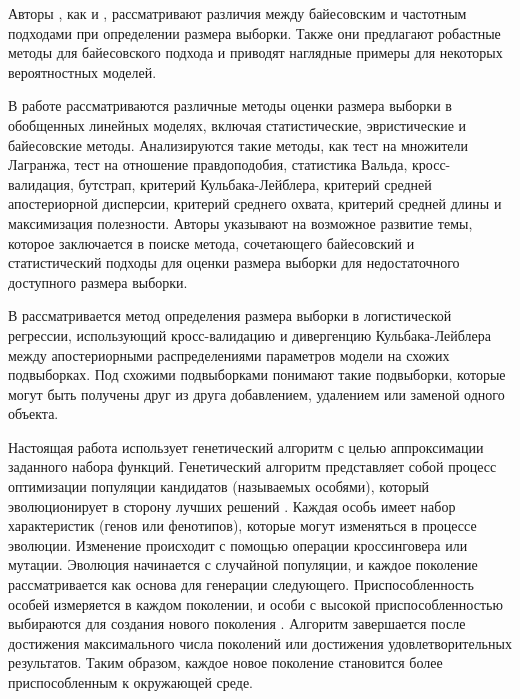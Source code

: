 Авторы \cite{Brutti2014}, как и \cite{Pezeshk2008}, рассматривают различия между байесовским и частотным подходами при определении размера выборки. Также они предлагают робастные методы для байесовского подхода и приводят наглядные примеры для некоторых вероятностных моделей.

В работе \cite{Grabovoy2022} рассматриваются различные методы оценки размера выборки в обобщенных линейных моделях, включая статистические, эвристические и байесовские методы. Анализируются такие методы, как тест на множители Лагранжа, тест на отношение правдоподобия, статистика Вальда, кросс-валидация, бутстрап, критерий Кульбака-Лейблера, критерий средней апостериорной дисперсии, критерий среднего охвата, критерий средней длины и максимизация полезности. Авторы указывают на возможное развитие темы, которое заключается в поиске метода, сочетающего байесовский и статистический подходы для оценки размера выборки для недостаточного доступного размера выборки.

В \cite{MOTRENKO2014743} рассматривается метод определения размера выборки в логистической регрессии, использующий кросс-валидацию и дивергенцию Кульбака-Лейблера между апостериорными распределениями параметров модели на схожих подвыборках. Под схожими подвыборками понимают такие подвыборки, которые могут быть получены друг из друга добавлением, удалением или заменой одного объекта.

Настоящая работа использует генетический алгоритм \citep{Goldberg1988} с целью аппроксимации заданного набора функций. Генетический алгоритм представляет собой процесс оптимизации популяции кандидатов (называемых особями), который эволюционирует в сторону лучших решений \citep{Mirjalili2019}. Каждая особь имеет набор характеристик (генов или фенотипов), которые могут изменяться в процессе эволюции. Изменение происходит с помощью операции кроссинговера или мутации. Эволюция начинается с случайной популяции, и каждое поколение рассматривается как основа для генерации следующего. Приспособленность особей измеряется в каждом поколении, и особи с высокой приспособленностью выбираются для создания нового поколения \citep{Kramer2017}. Алгоритм завершается после достижения максимального числа поколений или достижения удовлетворительных результатов. Таким образом, каждое новое поколение становится более приспособленным к окружающей среде.